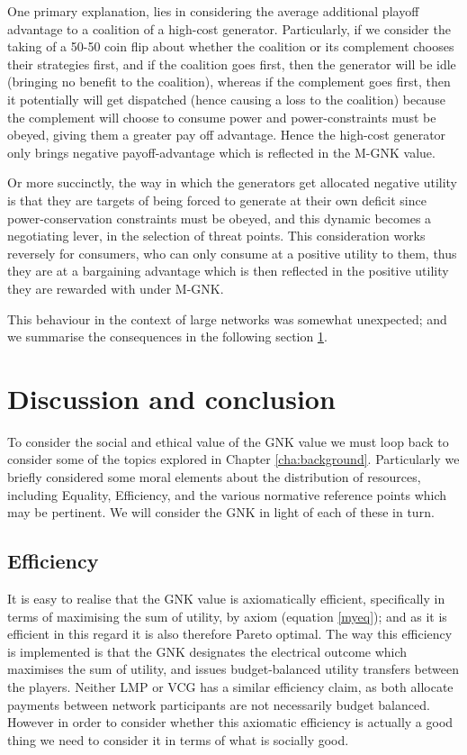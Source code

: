 One primary explanation, lies in considering the average additional playoff advantage to a coalition of a high-cost generator.
Particularly, if we consider the taking of a 50-50 coin flip about whether the coalition or its complement chooses their strategies first, and if the coalition goes first, then the generator will be idle (bringing no benefit to the coalition), whereas if the complement goes first, then it potentially will get dispatched (hence causing a loss to the coalition) because the complement will choose to consume power and power-constraints must be obeyed, giving them a greater pay off advantage.
Hence the high-cost generator only brings negative payoff-advantage which is reflected in the M-GNK value.

Or more succinctly, the way in which the generators get allocated negative utility is that they are targets of being forced to generate at their own deficit since power-conservation constraints must be obeyed, and this dynamic becomes a negotiating lever, in the selection of threat points.
This consideration works reversely for consumers, who can only consume at a positive utility to them, thus they are at a bargaining advantage which is then reflected in the positive utility they are rewarded with under M-GNK.

This behaviour in the context of large networks was somewhat unexpected; and we summarise the consequences in the following section \ref{sec:GNK_value_discussion}.




\section{Discussion and conclusion}\label{sec:GNK_value_discussion}

To consider the social and ethical value of the GNK value we must loop back to consider some of the topics explored in Chapter \ref{cha:background}.
Particularly we briefly considered some moral elements about the distribution of resources, including Equality, Efficiency, and the various normative reference points which may be pertinent.
We will consider the GNK in light of each of these in turn.

\subsection{Efficiency}
It is easy to realise that the GNK value is axiomatically efficient, specifically in terms of maximising the sum of utility, by axiom (equation \ref{myeq}); and as it is efficient in this regard it is also therefore Pareto optimal.
The way this efficiency is implemented is that the GNK designates the electrical outcome which maximises the sum of utility, and issues budget-balanced utility transfers between the players.
Neither LMP or VCG has a similar efficiency claim, as both allocate payments between network participants are not necessarily budget balanced.
However in order to consider whether this axiomatic efficiency is actually a good thing we need to consider it in terms of what is socially good.

